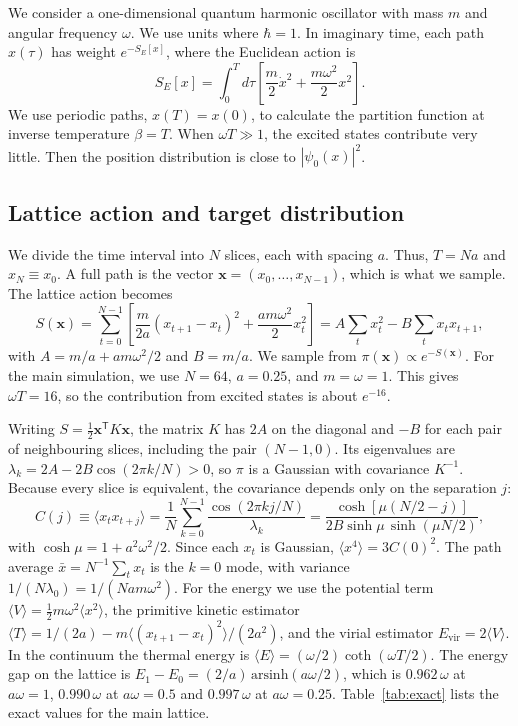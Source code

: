 \documentclass[11pt]{article}
\begin{document}
We consider a one-dimensional quantum harmonic oscillator with mass $m$ and
angular frequency $\omega$. We use units where $\hbar = 1$. In imaginary time,
each path $x(\tau)$ has weight $e^{-S_E[x]}$, where the Euclidean action is
\begin{equation}
  S_E[x] = \int_0^{T} d\tau \left[ \frac{m}{2}\dot{x}^2
           + \frac{m\omega^2}{2}x^2 \right].
\end{equation}
We use periodic paths, $x(T) = x(0)$, to calculate the partition function at
inverse temperature $\beta = T$. When $\omega T \gg 1$, the excited states
contribute very little. Then the position distribution is close to
$|\psi_0(x)|^2$.

\subsection{Lattice action and target distribution}

We divide the time interval into $N$ slices, each with spacing $a$. Thus,
$T = Na$ and $x_N \equiv x_0$. A full path is the vector
$\mathbf{x} = (x_0, \dots, x_{N-1})$, which is what we sample. The lattice
action becomes
\begin{equation}
  S(\mathbf{x}) = \sum_{t=0}^{N-1}\left[\frac{m}{2a}(x_{t+1}-x_t)^2
                + \frac{a m\omega^2}{2}x_t^2\right]
  = A\sum_t x_t^2 - B\sum_t x_t x_{t+1},
  \label{eq:action}
\end{equation}
with $A = m/a + a m\omega^2/2$ and $B = m/a$. We sample from
$\pi(\mathbf{x}) \propto e^{-S(\mathbf{x})}$. For the main simulation, we use
$N = 64$, $a = 0.25$, and $m = \omega = 1$. This gives $\omega T = 16$, so the
contribution from excited states is about $e^{-16}$.

Writing $S = \tfrac12 \mathbf{x}^{\mathsf T} K \mathbf{x}$, the matrix $K$ has
$2A$ on the diagonal and $-B$ for each pair of neighbouring slices, including
the pair $(N-1, 0)$. Its eigenvalues are
$\lambda_k = 2A - 2B\cos(2\pi k/N) > 0$, so $\pi$ is a Gaussian with
covariance $K^{-1}$. Because every slice is equivalent, the covariance depends
only on the separation $j$:
\begin{equation}
  C(j) \equiv \langle x_t x_{t+j}\rangle
  = \frac{1}{N}\sum_{k=0}^{N-1}\frac{\cos(2\pi kj/N)}{\lambda_k}
  = \frac{\cosh[\mu(N/2 - j)]}{2B\sinh\mu\,\sinh(\mu N/2)},
  \label{eq:corr}
\end{equation}
with $\cosh\mu = 1 + a^2\omega^2/2$. Since each $x_t$ is Gaussian,
$\langle x^4\rangle = 3C(0)^2$. The path average
$\bar{x} = N^{-1}\sum_t x_t$ is the $k = 0$ mode, with variance
$1/(N\lambda_0) = 1/(Nam\omega^2)$. For the energy we use the potential term
$\langle V\rangle = \tfrac12 m\omega^2\langle x^2\rangle$, the primitive
kinetic estimator
$\langle T\rangle = 1/(2a) - m\langle(x_{t+1}-x_t)^2\rangle/(2a^2)$, and the
virial estimator $E_{\mathrm{vir}} = 2\langle V\rangle$. In the continuum the
thermal energy is $\langle E\rangle = (\omega/2)\coth(\omega T/2)$. The energy
gap on the lattice is $E_1 - E_0 = (2/a)\,\mathrm{arsinh}(a\omega/2)$, which is
$0.962\,\omega$ at $a\omega = 1$, $0.990\,\omega$ at $a\omega = 0.5$ and
$0.997\,\omega$ at $a\omega = 0.25$. Table~\ref{tab:exact} lists the exact
values for the main lattice.
\end{document}
